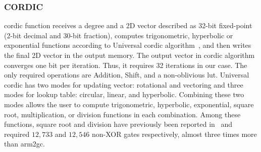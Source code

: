 \subsubsection{CORDIC}
\acrfull{cordic} function receives a degree and a 2D vector described as 32-bit fixed-point (2-bit decimal and 30-bit fraction), computes trigonometric, hyperbolic or exponential functions according to Universal \acrshort{cordic} algorithm~\cite{volder1959cordic}, and then writes the final 2D vector in the output memory.
The output vector in \acrshort{cordic} algorithm converges one bit per iteration.
Thus, it requires 32 iterations in our case.
The only required operations are Addition, Shift, and a non-oblivious \acrlong{lut}.
Universal \acrshort{cordic} has two modes for updating vector: rotational and vectoring and three modes for lookup table: circular, linear, and hyperbolic.
Combining these two modes allows the user to compute trigonometric, hyperbolic, exponential, square root, multiplication, or division functions in each combination.
Among these functions, square root and division have previously been reported in~\cite{hussain2016privacy} and required $12,733$ and $12,546$ non-XOR gates respectively, almost three times more than \gls{arm2gc}.
